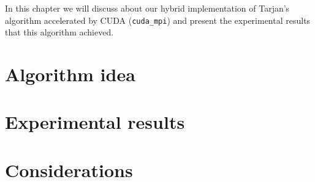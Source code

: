 \label{ch:4}
In this chapter we will discuss about our hybrid implementation of Tarjan's algorithm accelerated by CUDA (\verb|cuda_mpi|) and present the experimental results that this algorithm achieved.

\section{Algorithm idea}


\section{Experimental results}


\section{Considerations}
